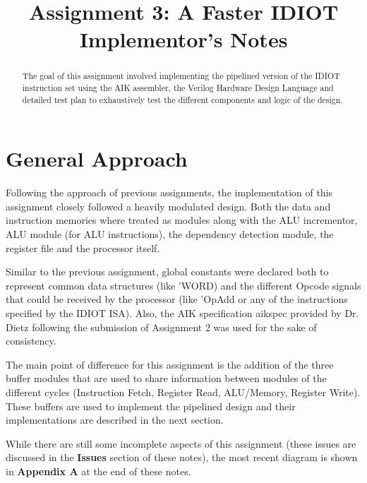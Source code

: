\documentclass[conference]{IEEEtran}
\begin{document}
\title{Assignment 3: A Faster IDIOT\\Implementor's Notes}
\author{
        }

\maketitle

\begin{abstract}
The goal of this assignment involved implementing the pipelined version of 
the IDIOT instruction set using the AIK assembler, the Verilog Hardware
Design Language and detailed test plan to exhaustively test the different 
components and logic of the design. 
\end{abstract}

\section{General Approach}
Following the approach of previous assignments, the implementation of this 
assignment closely followed a heavily modulated design. Both the data and 
instruction memories where treated as modules along with the ALU incrementor,
ALU module (for ALU instructions), the dependency detection module, the 
register file and the processor itself. 

Similar to the previous assignment, global constants were declared both to 
represent common data structures (like 'WORD) and the different Opcode 
signals that could be received by the processor (like 'OpAdd or any of the 
instructions specified by the IDIOT ISA). Also, the AIK specification aikspec
provided by Dr. Dietz following the submission of Assignment 2 was used
for the sake of consistency.

The main point of difference for this assignment is the addition of the three
buffer modules that are used to share information between modules of the 
different cycles (Instruction Fetch, Register Read, ALU/Memory, Register
Write). These buffers are used to implement the pipelined design and their 
implementations are described in the next section.

While there are still some incomplete aspects of this assignment (these issues 
are discussed in the \textbf{Issues} section of these notes), the most recent 
diagram is shown in \textbf{Appendix A} at the end of these notes. 
\end{document}
